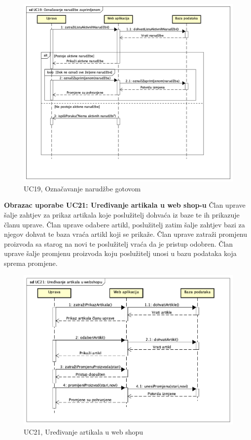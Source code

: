 				\begin{figure}[H]
					\includegraphics[width=\linewidth]{dijagrami/UC19.png}
					\centering
					\caption{UC19, Označavanje narudžbe gotovom}
					\label{fig:SequanceDiagram3}
				\end{figure}
			\textbf{Obrazac uporabe UC21: Uređivanje artikala u web shop-u}
			\bigbreak
			\textnormal {Član uprave šalje zahtjev za prikaz artikala koje poslužitelj dohvaća iz baze te ih prikazuje članu uprave. Član uprave odabere artikl, poslužitelj zatim šalje zahtjev bazi za njegov dohvat te baza vraća artikl koji se prikaže. Član uprave zatraži promjenu proizvoda sa starog na novi te poslužitelj vraća da je pristup odobren. Član uprave šalje promjenu proizvoda koju poslužitelj unosi u bazu podataka koja sprema promjene.}
				\begin{figure}[H]
					\includegraphics[width=\linewidth]{dijagrami/UC21.png}
					\centering
					\caption{UC21, Uređivanje artikala u web shopu}
					\label{fig:SequanceDiagram4}
				\end{figure}
	\eject
